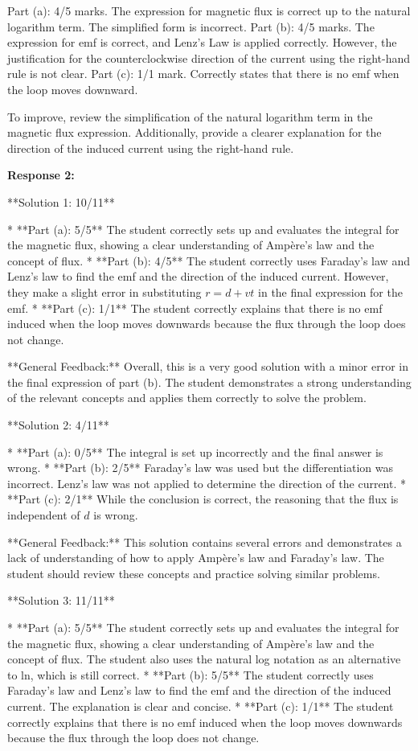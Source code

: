 \documentclass[a4paper,11pt]{article}
\begin{document}
Part (a): 4/5 marks. The expression for magnetic flux is correct up to the natural logarithm term. The simplified form is incorrect. 
Part (b): 4/5 marks. The expression for emf is correct, and Lenz's Law is applied correctly. However, the justification for the counterclockwise direction of the current using the right-hand rule is not clear.
Part (c): 1/1 mark. Correctly states that there is no emf when the loop moves downward.

To improve, review the simplification of the natural logarithm term in the magnetic flux expression. Additionally, provide a clearer explanation for the direction of the induced current using the right-hand rule.


\textbf{Response 2:}

**Solution 1: 10/11**

*   **Part (a): 5/5**  The student correctly sets up and evaluates the integral for the magnetic flux, showing a clear understanding of Ampère's law and the concept of flux.
*   **Part (b): 4/5** The student correctly uses Faraday's law and Lenz's law to find the emf and the direction of the induced current. However, they make a slight error in substituting \(r = d + vt\) in the final expression for the emf.
*   **Part (c): 1/1** The student correctly explains that there is no emf induced when the loop moves downwards because the flux through the loop does not change.

**General Feedback:** Overall, this is a very good solution with a minor error in the final expression of part (b). The student demonstrates a strong understanding of the relevant concepts and applies them correctly to solve the problem.

**Solution 2: 4/11**

*   **Part (a): 0/5** The integral is set up incorrectly and the final answer is wrong.
*   **Part (b): 2/5** Faraday's law was used but the differentiation was incorrect. Lenz's law was not applied to determine the direction of the current.
*   **Part (c): 2/1** While the conclusion is correct, the reasoning that the flux is independent of \(d\) is wrong.

**General Feedback:** This solution contains several errors and demonstrates a lack of understanding of how to apply Ampère's law and Faraday's law. The student should review these concepts and practice solving similar problems.

**Solution 3: 11/11**

*   **Part (a): 5/5** The student correctly sets up and evaluates the integral for the magnetic flux, showing a clear understanding of Ampère's law and the concept of flux. The student also uses the natural log notation as an alternative to ln, which is still correct.
*   **Part (b): 5/5** The student correctly uses Faraday's law and Lenz's law to find the emf and the direction of the induced current. The explanation is clear and concise.
*   **Part (c): 1/1** The student correctly explains that there is no emf induced when the loop moves downwards because the flux through the loop does not change.
\end{document}
